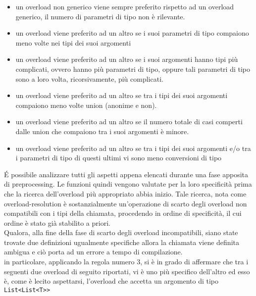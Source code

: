 \begin{itemize}
    \item{
        un overload non generico viene sempre preferito rispetto ad un overload generico, il 
        numero di parametri di tipo non è rilevante.
    }
    \item{
        un overload viene preferito ad un altro se i suoi parametri di tipo compaiono 
        meno volte nei tipi dei suoi argomenti
    }
    \item{
        un overload viene preferito ad un altro se i suoi argomenti hanno tipi più complicati, 
        ovvero hanno più parametri di tipo, oppure tali parametri di tipo sono a loro volta, 
        ricorsivamente, più complicati. 
    }
    \item{
        un overload viene preferito ad un altro se tra i tipi dei suoi argomenti 
        compaiono meno volte union (anonime e non).
    }
    \item{
        un overload viene preferito ad un altro se il numero totale di casi comperti dalle 
        union che compaiono tra i suoi argomenti è minore.
    }
    \item{
        un overload viene preferito ad un altro se tra i tipi dei suoi argomenti e/o tra i 
        parametri di tipo di questi ultimi vi sono meno conversioni di tipo
    }
\end{itemize}

É possibile analizzare tutti gli aspetti appena elencati durante una fase apposita 
di preprocessing. Le funzioni quindi vengono valutate per la loro specificità 
prima che la ricerca dell’overload più appropriato abbia inizio. Tale ricerca, 
nota come overload-resolution è sostanzialmente un’operazione di scarto degli 
overload non compatibili con i tipi della chiamata, procedendo in ordine di specificità, 
il cui ordine è stato già stabilito a priori. \\

Qualora, alla fine della fase di scarto 
degli overload incompatibili, siano state trovate due definizioni ugualmente specifiche 
allora la chiamata viene definita ambigua e ciò porta ad un errore a tempo di compilazione. \\

in particolare, applicando la regola numero 3, si è in grado di affermare 
che tra i seguenti due overload di seguito riportati, vi è uno più specifico 
dell’altro ed esso è, come è lecito aspettarsi, l’overload che 
accetta un argomento di tipo \texttt{List<List<T>\>>}

